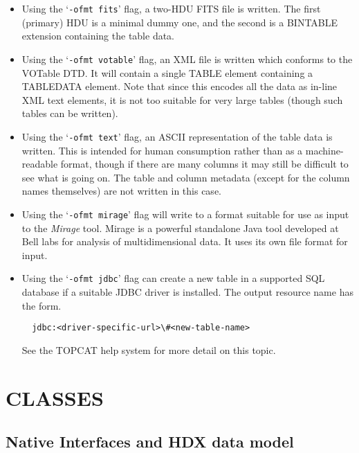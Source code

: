 \documentclass[twoside,11pt]{article}
\newcommand{\xlabel}[1]{}
\renewcommand{\_}{\texttt{\symbol{95}}}
\begin{document}
\begin{itemize}

\item Using the `\texttt{-ofmt fits}' flag, a two-HDU FITS file is written.
The first (primary) HDU is a minimal dummy one, and the second is
a BINTABLE extension containing the table data.

\item Using the `\texttt{-ofmt votable}' flag, an XML file is written
which conforms to the VOTable DTD.  It will contain a single TABLE
element containing a TABLEDATA element.
Note that since this encodes all the data as in-line XML text elements,
it is not too suitable for very large tables (though such tables can
be written).

\item Using the `\texttt{-ofmt text}' flag, an ASCII representation of the
table data is written.  This is intended for human consumption rather
than as a machine-readable format, though if there are many columns
it may still be difficult to see what is going on.  The table and
column metadata (except for the column names themselves) are not
written in this case.

\item Using the `\texttt{-ofmt mirage}' flag will write to a format suitable for
use as input to the {\em Mirage\/} tool.
Mirage is a powerful standalone Java tool developed at Bell labs for
analysis of multidimensional data.  It uses its own file format for input.

\item Using the `\texttt{-ofmt jdbc}' flag can create a new table in a supported
SQL database if a suitable JDBC driver is installed.  The output resource
name has the form.
\begin{verbatim}
  jdbc:<driver-specific-url>\#<new-table-name>
\end{verbatim}

See the TOPCAT help system for more detail on this topic.
\end{itemize}

\section{\label{classes}\xlabel{classes}CLASSES}

\subsection{\label{native}\xlabel{native}Native Interfaces and HDX data model}
\end{document}

